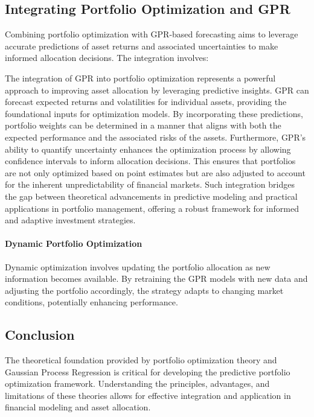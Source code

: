 \subsection{Integrating Portfolio Optimization and \ac{GPR}}

Combining portfolio optimization with GPR-based forecasting aims to leverage accurate predictions of asset returns and associated uncertainties to make informed allocation decisions. The integration involves:

The integration of GPR into portfolio optimization represents a powerful approach to improving asset allocation by leveraging predictive insights. GPR can forecast expected returns and volatilities for individual assets, providing the foundational inputs for optimization models. By incorporating these predictions, portfolio weights can be determined in a manner that aligns with both the expected performance and the associated risks of the assets. Furthermore, GPR's ability to quantify uncertainty enhances the optimization process by allowing confidence intervals to inform allocation decisions. This ensures that portfolios are not only optimized based on point estimates but are also adjusted to account for the inherent unpredictability of financial markets. Such integration bridges the gap between theoretical advancements in predictive modeling and practical applications in portfolio management, offering a robust framework for informed and adaptive investment strategies.
\paragraph{Dynamic Portfolio Optimization}

Dynamic optimization involves updating the portfolio allocation as new information becomes available. By retraining the GPR models with new data and adjusting the portfolio accordingly, the strategy adapts to changing market conditions, potentially enhancing performance.

\subsection{Conclusion}

The theoretical foundation provided by portfolio optimization theory and Gaussian Process Regression is critical for developing the predictive portfolio optimization framework. Understanding the principles, advantages, and limitations of these theories allows for effective integration and application in financial modeling and asset allocation.


